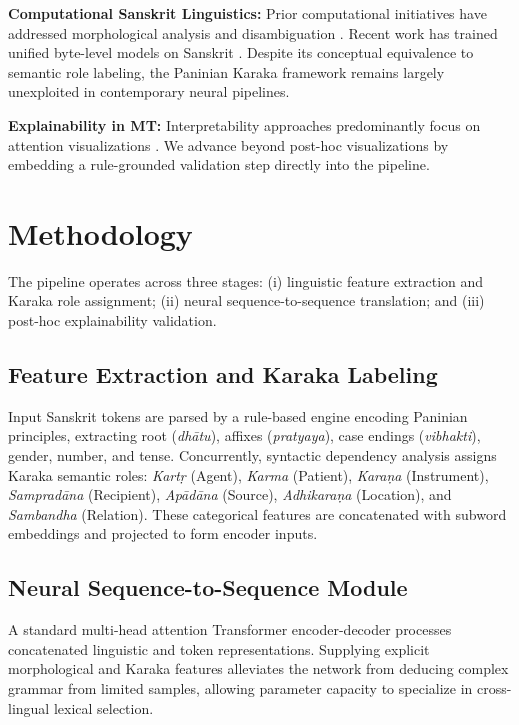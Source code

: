 \documentclass[11pt]{article}
\begin{document}
\textbf{Computational Sanskrit Linguistics:} Prior computational initiatives have addressed morphological analysis and disambiguation \cite{hellwig2015morphological}. Recent work has trained unified byte-level models on Sanskrit \cite{nehrdich2024one}. Despite its conceptual equivalence to semantic role labeling, the Paninian Karaka framework remains largely unexploited in contemporary neural pipelines.

\textbf{Explainability in MT:} Interpretability approaches predominantly focus on attention visualizations \cite{luong2015effective}. We advance beyond post-hoc visualizations by embedding a rule-grounded validation step directly into the pipeline.

\section{Methodology}
The pipeline operates across three stages: (i) linguistic feature extraction and Karaka role assignment; (ii) neural sequence-to-sequence translation; and (iii) post-hoc explainability validation.

\subsection{Feature Extraction and Karaka Labeling}
Input Sanskrit tokens are parsed by a rule-based engine encoding Paninian principles, extracting root (\textit{dh\=atu}), affixes (\textit{pratyaya}), case endings (\textit{vibhakti}), gender, number, and tense. Concurrently, syntactic dependency analysis assigns Karaka semantic roles: \textit{Kart\d{r}} (Agent), \textit{Karma} (Patient), \textit{Kara\d{n}a} (Instrument), \textit{Samprad\=ana} (Recipient), \textit{Ap\=ad\=ana} (Source), \textit{Adhikara\d{n}a} (Location), and \textit{Sambandha} (Relation). These categorical features are concatenated with subword embeddings and projected to form encoder inputs.

\subsection{Neural Sequence-to-Sequence Module}
A standard multi-head attention Transformer encoder-decoder processes concatenated linguistic and token representations. Supplying explicit morphological and Karaka features alleviates the network from deducing complex grammar from limited samples, allowing parameter capacity to specialize in cross-lingual lexical selection.
\end{document}
